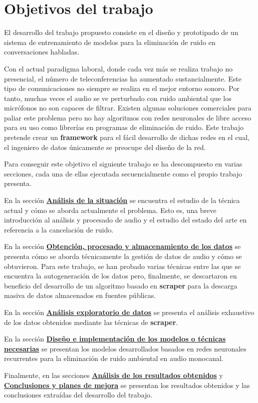 \chapter{Objetivos del trabajo}
El desarrollo del trabajo propuesto consiste en el diseño y prototipado de un sistema de entrenamiento de modelos para la eliminación de ruido en conversaciones habladas.

Con el actual paradigma laboral, donde cada vez más se realiza trabajo no presencial, el número de teleconferencias ha aumentado sustancialmente. Este tipo de comunicaciones no siempre se realiza en el mejor entorno sonoro. Por tanto, muchas veces el audio se ve perturbado con ruido ambiental que los micrófonos no son capaces de filtrar. Existen algunas soluciones comerciales para paliar este problema pero no hay algoritmos con redes neuronales de libre acceso para su uso como librerías en programas de eliminación de ruido. Este trabajo pretende crear un \textbf{\gls{framework}} para el fácil desarrollo de dichas redes en el cual, el ingeniero de datos únicamente se preocupe del diseño de la red.

Para conseguir este objetivo el siguiente trabajo se ha descompuesto en varias secciones, cada una de ellas ejecutada secuencialmente como el propio trabajo presenta.

En la sección \hyperref[cp: situationalAnalysis]{\textbf{Análisis de la situación}} se encuentra el estudio de la técnica actual y cómo se aborda actualmente el problema. Esto es, una breve introducción al análisis y procesado de audio y el estudio del estado del arte en referencia a la cancelación de ruido.

En la sección \hyperref[cp: dataGathering]{\textbf{Obtención, procesado y almacenamiento de los datos}} se presenta cómo se aborda técnicamente la gestión de datos de audio y cómo se obtuvieron. Para este trabajo, se han probado varias técnicas entre las que se encuentra la autogeneración de los datos pero, finalmente, se descartaron en beneficio del desarrollo de un algoritmo basado en \textbf{\gls{scraper}} para la descarga masiva de datos almacenados en fuentes públicas.

En la sección \hyperref[cp: eda]{\textbf{Análisis exploratorio de datos}} se presenta el análisis exhaustivo de los datos obtenidos mediante las técnicas de \textbf{\gls{scraper}}.

En la sección \hyperref[cp: modelDesign]{\textbf{Diseño e implementación de los modelos o técnicas necesarias}} se presentan los modelos desarrollados basados en redes neuronales recurrentes para la eliminación de ruido ambiental en audio monocanal.

Finalmente, en las secciones \hyperref[cp: results]{\textbf{Análisis de los resultados obtenidos}} y \hyperref[cp: conclusions]{\textbf{Conclusiones y planes de mejora}} se presentan los resultados obtenidos y las conclusiones extraídas del desarrollo del trabajo.



